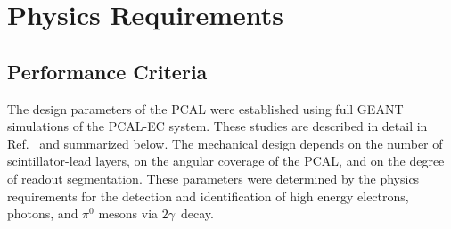 \section{Physics Requirements}

\subsection{Performance Criteria}
The design parameters of the PCAL were established using full GEANT simulations of the PCAL-EC system. These studies are described in detail in Ref.~\cite{2007001} and summarized below. The mechanical design depends on the number of scintillator-lead layers, on the angular coverage of the PCAL, and on the degree of readout segmentation.  These parameters were determined by the physics requirements for the detection and identification of high energy electrons, photons, and $\pi^{0}$ mesons via $2\gamma$\ decay.

